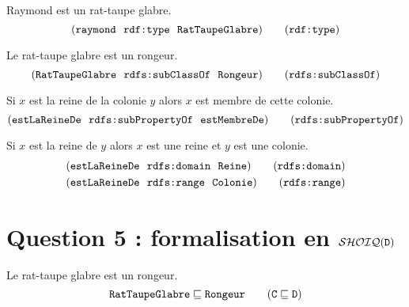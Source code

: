 \documentclass[11pt, a4paper]{article}
\def\fm#1{\text{\texttt{#1}}}
\def\SHOIQD{{\mathcal{SHOIQ}}(\fm{D})}
\def\conceptD{\fm{D}}
\def\conceptC{\fm{C}}
\def\subsumepar{\sqsubseteq}
\begin{document}
	Raymond est un rat-taupe glabre.
	\begin{equation*}
	(\fm{raymond} ~~ \fm{rdf:type} ~~ \fm{RatTaupeGlabre})
	\tag{$\fm{rdf:type}$}
	\end{equation*}
	
	Le rat-taupe glabre est un rongeur.
	\begin{equation*}
	(\fm{RatTaupeGlabre} ~~ \fm{rdfs:subClassOf} ~~ \fm{Rongeur})
	\tag{$\fm{rdfs:subClassOf}$}
	\end{equation*}
	
	Si $x$ est la reine de la colonie $y$ alors $x$ est membre de cette colonie.
	\begin{equation*}
	(\fm{estLaReineDe} ~~ \fm{rdfs:subPropertyOf} ~~ \fm{estMembreDe})
	\tag{$\fm{rdfs:subPropertyOf}$}
	\end{equation*}
	
	Si $x$ est la reine de $y$ alors $x$ est une reine
	et $y$ est une colonie.
	\begin{gather*}
	(\fm{estLaReineDe} ~~ \fm{rdfs:domain} ~~ \fm{Reine})
	\tag{$\fm{rdfs:domain}$}
	\\
	(\fm{estLaReineDe} ~~ \fm{rdfs:range} ~~ \fm{Colonie})
	\tag{$\fm{rdfs:range}$}
	\end{gather*}
	
	
	\section*{Question 5 : formalisation en $\SHOIQD$}
	
	\bgroup
	\def\alienor{\text{\textsc{aliénor}}}
	\def\aPourHabitant{\fm{aPourHabitant}}
	\def\aPourPetit{\fm{aPourPetit}}
	\def\aPourReine{\fm{aPourReine}}
	\def\aPourSexe{\fm{aPourSexe}}
	\def\estDansLaMemeColonieQue{\fm{estDansLaMêmeColonieQue}}
	\def\estSitueEn{\fm{estSituéEn}}
	\def\AnimalEusocial{\fm{AnimalEusocial}}
	\def\Colonie{\fm{Colonie}}
	\def\ColonieRTG{\fm{ColonieRTG}}
	\def\Mammifere{\fm{Mammifère}}
	\def\marcel{\text{\textsc{marcel}}}
	\def\Reine{\fm{Reine}}
	\def\RTG{\fm{RatTaupeGlabre}}
	\def\RTGMale{\fm{RatTaupeGlabreMâle}}
	\def\RTD{\fm{RatTaupeDeDamara}}
	\def\Rongeur{\fm{Rongeur}}
	\def\Sexefeminin{\fm{Sexeféminin}}
	\def\SexeMasculin{\fm{SexeMasculin}}
	\def\somalie{\text{\textsc{somalie}}}
	\def\tailleEnCentimetres{\fm{tailleEnCentimètres}}
	\def\vitDans{\fm{vitDans}}
	
	Le rat-taupe glabre est un rongeur.
	\begin{equation*}
	\RTG \subsumepar \Rongeur
	\tag{$\conceptC\subsumepar\conceptD$}
	\end{equation*}
	
\end{document}
